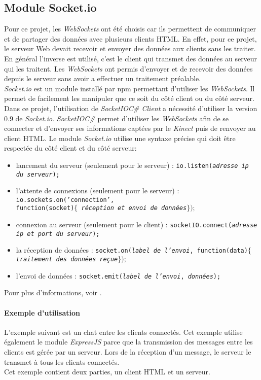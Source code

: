 \subsection{Module Socket.io}
Pour ce projet, les \textit{WebSockets} ont été choisis car ils permettent de communiquer et de partager des données avec plusieurs clients HTML. En effet, pour ce projet, le serveur Web devait recevoir et envoyer des données aux clients sans les traiter. En général l'inverse est utilisé, c'est le client qui transmet des données au serveur qui les traitent. Les \textit{WebSockets} ont permis d'envoyer et de recevoir des données depuis le serveur sans avoir a effectuer un traitement préalable. \\

\textit{Socket.io} est un module installé par npm permettant d'utiliser les \textit{WebSockets}. Il permet de facilement les manipuler que ce soit du côté client ou du côté serveur. Dans ce projet, l'utilisation de \textit{SocketIOC\# Client} a nécessité d'utiliser la version 0.9 de \textit{Socket.io}. \textit{SocketIOC\#} permet d'utiliser les \textit{WebSockets} afin de se connecter et d'envoyer ses informations captées par le \textit{Kinect} puis de renvoyer au client HTML. Le module \textit{Socket.io} utilise une syntaxe précise qui doit être respectée du côté client et du côté serveur: 
\begin{itemize}
\item lancement du serveur (seulement pour le serveur) : \texttt{io.listen(\textit{adresse ip du serveur});}
\item l'attente de connexions (seulement pour le serveur) : \texttt{io.sockets.on('connection', \\
function(socket)$\{$ \textit{réception et envoi de données}$\});$}
\item connexion au serveur (seulement pour le client) : \texttt{socketIO.connect(\textit{adresse ip et port du serveur});}
\item la réception de données : \texttt{socket.on(\textit{label de l'envoi}, function(data)$\{$\textit{traitement des données reçue}$\});$}
\item l'envoi de données : \texttt{socket.emit(\textit{label de l'envoi}, \textit{données});}
\end{itemize}
Pour plus d'informations, voir \cite{SocketIO}.\\

\paragraph{Exemple d'utilisation \\}
L'exemple suivant est un chat entre les clients connectés. Cet exemple utilise également le module \textit{ExpressJS} parce que la transmission des messages entre les clients est gérée par un serveur. Lors de la réception d'un message, le serveur le transmet à tous les clients connectés. \\
Cet exemple contient deux parties, un client HTML et un serveur.

